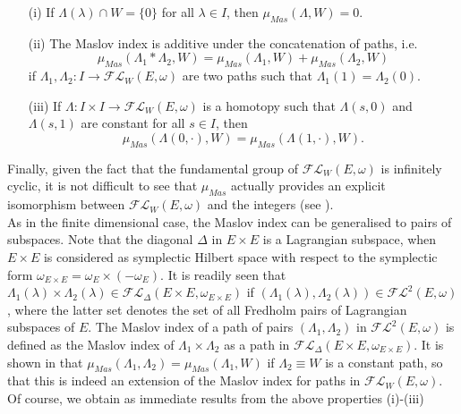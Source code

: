 \documentclass[a4paper,10pt]{article}
\begin{document}
\begin{enumerate}
\item[(i)] If $\Lambda(\lambda)\cap W=\{0\}$ for all $\lambda\in I$, then $\mu_{Mas}(\Lambda,W)=0$.
\item[(ii)] The Maslov index is additive under the concatenation of paths, i.e.
\[\mu_{Mas}(\Lambda_1\ast\Lambda_2,W)=\mu_{Mas}(\Lambda_1,W)+\mu_{Mas}(\Lambda_2,W)\]
if $\Lambda_1,\Lambda_2:I\rightarrow\mathcal{FL}_W(E,\omega)$ are two paths such that $\Lambda_1(1)=\Lambda_2(0)$.
\item[(iii)] If $\Lambda:I\times I\rightarrow\mathcal{FL}_W(E,\omega)$ is a homotopy such that $\Lambda(s,0)$ and $\Lambda(s,1)$ are constant for all $s\in I$, then
\[\mu_{Mas}(\Lambda(0,\cdot),W)=\mu_{Mas}(\Lambda(1,\cdot),W).\]
\end{enumerate}
Finally, given the fact that the fundamental group of $\mathcal{FL}_W(E,\omega)$ is infinitely cyclic, it is not difficult to see that $\mu_{Mas}$ actually provides an explicit isomorphism between $\mathcal{FL}_W(E,\omega)$ and the integers (see \cite[\S 3]{Furutani}).\\
As in the finite dimensional case, the Maslov index can be generalised to pairs of subspaces. Note that the diagonal $\Delta$ in $E\times E$ is a Lagrangian subspace, when $E\times E$ is considered as symplectic Hilbert space with respect to the symplectic form $\omega_{E\times E}=\omega_E\times(-\omega_E)$. It is readily seen that $\Lambda_1(\lambda)\times\Lambda_2(\lambda)\in \mathcal{FL}_\Delta(E\times E,\omega_{E\times E})$ if $(\Lambda_1(\lambda),\Lambda_2(\lambda))\in\mathcal{FL}^2(E,\omega)$, where the latter set denotes the set of all Fredholm pairs of Lagrangian subspaces of $E$. The Maslov index of a path of pairs $(\Lambda_1,\Lambda_2)$ in $\mathcal{FL}^2(E,\omega)$ is defined as the Maslov index of $\Lambda_1\times\Lambda_2$ as a path in $\mathcal{FL}_\Delta(E\times E,\omega_{E\times E})$. It is shown in \cite[Prop. 2.32]{Furutani} that $\mu_{Mas}(\Lambda_1,\Lambda_2)=\mu_{Mas}(\Lambda_1,W)$ if $\Lambda_2\equiv W$ is a constant path, so that this is indeed an extension of the Maslov index for paths in $\mathcal{FL}_W(E,\omega)$. Of course, we obtain as immediate results from the above properties (i)-(iii)
\end{document}
